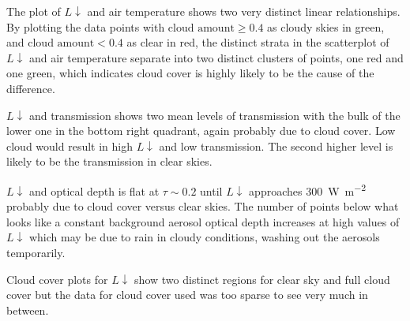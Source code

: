\documentclass[a4paper,titlepage, twoside]{report}
\newcommand\Ldown{L\!\!\downarrow}
\begin{document}
The plot of $\Ldown$ and air temperature shows two very distinct linear relationships. By plotting the data points with $\text{cloud amount} \geq 0.4$ as cloudy skies in green, and $\text{cloud amount} < 0.4$ as clear in red, the distinct strata in the scatterplot of $\Ldown$ and air temperature separate into two distinct clusters of points, one red and one green, which indicates cloud cover is highly likely to be the cause of the difference.

$\Ldown$ and transmission shows two mean levels of transmission with the bulk of the lower one in the bottom right quadrant, again probably due to cloud cover. Low cloud would result in high $\Ldown$ and low transmission. The second higher level is likely to be the transmission in clear skies.

$\Ldown$ and optical depth is flat at $\tau \sim 0.2$ until $\Ldown$ approaches \SI{300}{\watt\per\meter\squared} probably due to cloud cover versus clear skies. The number of points below what looks like a constant background aerosol optical depth increases at high values of $\Ldown$ which may be due to rain in cloudy conditions, washing out the aerosols temporarily.

Cloud cover plots for $\Ldown$ show two distinct regions for clear sky and full cloud cover but the data for cloud cover used was too sparse to see very much in between.
\end{document}
